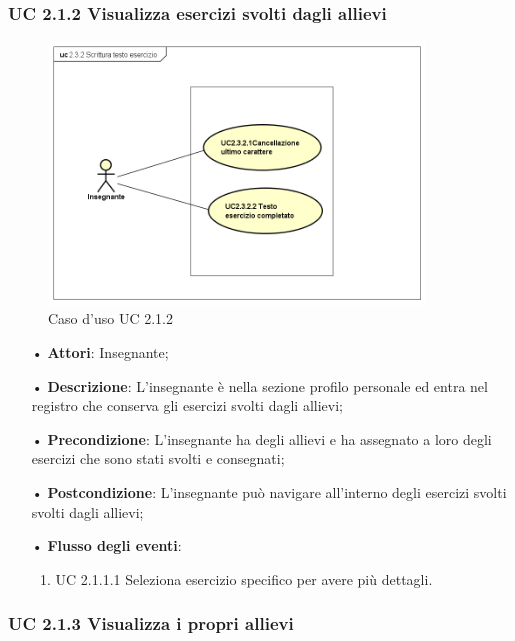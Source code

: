 \subsubsection{UC 2.1.2  Visualizza esercizi svolti dagli allievi}
\begin{figure}[H]
\centering
\includegraphics[width=10cm]{img/UC222.png} 
\caption{Caso d'uso UC 2.1.2}
\end{figure}
\begin{itemize}
	\item[•] \textbf{Attori}: Insegnante;
	\item[•] \textbf{Descrizione}:  L’insegnante è nella sezione profilo personale ed entra
		nel registro che conserva gli esercizi svolti dagli allievi;
	\item[•] \textbf{Precondizione}:  L’insegnante ha degli allievi e ha assegnato a loro degli esercizi che sono stati svolti e consegnati;

	\item[•] \textbf{Postcondizione}: L’insegnante può navigare all’interno degli esercizi svolti 
                       svolti dagli allievi; 

	\item[•] \textbf{Flusso degli eventi}:
		\begin{enumerate}
			\item UC 2.1.1.1  Seleziona esercizio specifico per avere più dettagli.	
		\end{enumerate}
\end{itemize}

\subsubsection{UC 2.1.3 Visualizza i propri allievi}

